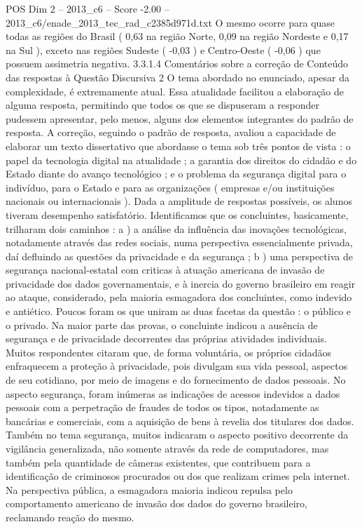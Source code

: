 \begin{textsample}{POS Dim 2 – 2013\_c6 – Score -2.00 – 2013\_c6/enade\_2013\_tec\_rad\_c2385d971d.txt}
O mesmo ocorre para quase todas as regiões do Brasil ( 0,63 na região Norte, 0,09 na região Nordeste e 0,17 na Sul ), exceto nas regiões Sudeste ( -0,03 ) e Centro-Oeste ( -0,06 ) que possuem assimetria negativa. 3.3.1.4 Comentários sobre a correção de Conteúdo das respostas à Questão Discursiva 2 O tema abordado no enunciado, apesar da complexidade, é extremamente atual.
Essa atualidade facilitou a elaboração de alguma resposta, permitindo que todos os que se dispuseram a responder pudessem apresentar, pelo menos, alguns dos elementos integrantes do padrão de resposta.
A correção, seguindo o padrão de resposta, avaliou a capacidade de elaborar um texto dissertativo que abordasse o tema sob três pontos de vista : o papel da tecnologia digital na atualidade ; a garantia dos direitos do cidadão e do Estado diante do avanço tecnológico ; e o problema da segurança digital para o indivíduo, para o Estado e para as organizações ( empresas e/ou instituições nacionais ou internacionais ).
Dada a amplitude de respostas possíveis, os alunos tiveram desempenho satisfatório.
Identificamos que os concluintes, basicamente, trilharam dois caminhos : a ) a análise da influência das inovações tecnológicas, notadamente através das redes sociais, numa perspectiva essencialmente privada, daí defluindo as questões da privacidade e da segurança ; b ) uma perspectiva de segurança nacional-estatal com criticas à atuação americana de invasão de privacidade dos dados governamentais, e à inercia do governo brasileiro em reagir ao ataque, considerado, pela maioria esmagadora dos concluintes, como indevido e antiético.
Poucos foram os que uniram as duas facetas da questão : o público e o privado.
Na maior parte das provas, o concluinte indicou a ausência de segurança e de privacidade decorrentes das próprias atividades individuais.
Muitos respondentes citaram que, de forma voluntária, os próprios cidadãos enfraquecem a proteção à privacidade, pois divulgam sua vida pessoal, aspectos de seu cotidiano, por meio de imagens e do fornecimento de dados pessoais.
No aspecto segurança, foram inúmeras as indicações de acessos indevidos a dados pessoais com a perpetração de fraudes de todos os tipos, notadamente as bancárias e comerciais, com a aquisição de bens à revelia dos titulares dos dados.
Também no tema segurança, muitos indicaram o aspecto positivo decorrente da vigilância generalizada, não somente através da rede de computadores, mas também pela quantidade de câmeras existentes, que contribuem para a identificação de criminosos procurados ou dos que realizam crimes pela internet.
Na perspectiva pública, a esmagadora maioria indicou repulsa pelo comportamento americano de invasão dos dados do governo brasileiro, reclamando reação do mesmo.

\end{textsample}
